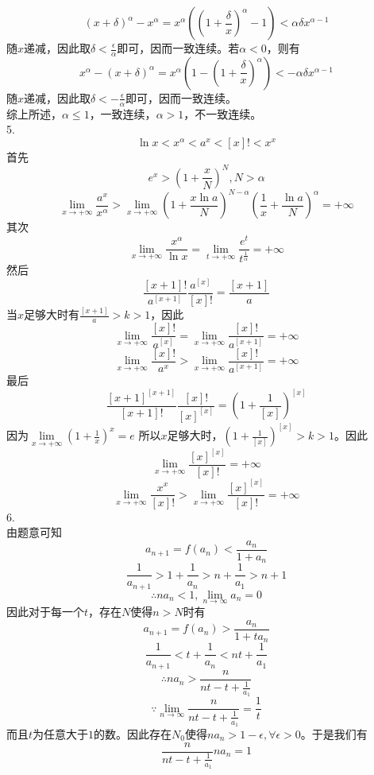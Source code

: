 \documentclass[utf8]{ctexart}
\begin{document}
\[(x+\delta)^\alpha-x^\alpha=x^\alpha((1+\frac{\delta}{x})^\alpha-1)<\alpha\delta x^{\alpha-1}\]
随$x$递减，因此取$\delta<\frac{\epsilon}{\alpha}$即可，因而一致连续。若$\alpha<0$，则有
\[x^\alpha-(x+\delta)^\alpha=x^\alpha(1-(1+\frac{\delta}{x})^\alpha)<-\alpha\delta x^{\alpha-1}\]
随$x$递减，因此取$\delta<-\frac{\epsilon}{\alpha}$即可，因而一致连续。\\
综上所述，$\alpha\le1$，一致连续，$\alpha>1$，不一致连续。\\
5.\\
\[\ln x<x^\alpha<a^x<[x]!<x^x\]
首先
\[e^x>(1+\frac{x}{N})^N,N>\alpha\]
\[\lim\limits_{x\rightarrow+\infty}\frac{a^x}{x^\alpha}>\lim\limits_{x\rightarrow+\infty}(1+\frac{x\ln a}{N})^{N-\alpha}(\frac{1}{x}+\frac{\ln a}{N})^\alpha=+\infty\]
其次
\[\lim\limits_{x\rightarrow+\infty}\frac{x^\alpha}{\ln x}=\lim\limits_{t\rightarrow+\infty}\frac{e^t}{t^\frac{1}{\alpha}}=+\infty\]
然后
\[\frac{[x+1]!}{a^{[x+1]}}\frac{a^{[x]}}{[x]!}=\frac{[x+1]}{a}\]
当$x$足够大时有$\frac{[x+1]}{a}>k>1$，因此
\[\lim\limits_{x\rightarrow+\infty}\frac{[x]!}{a^{[x]}}=\lim\limits_{x\rightarrow+\infty}\frac{[x]!}{a^{[x+1]}}=+\infty\]
\[\lim\limits_{x\rightarrow+\infty}\frac{[x]!}{a^x}>\lim\limits_{x\rightarrow+\infty}\frac{[x]!}{a^{[x+1]}}=+\infty\]
最后
\[\frac{[x+1]^{[x+1]}}{[x+1]!}\frac{[x]!}{[x]^{[x]}}=(1+\frac{1}{[x]})^{[x]}\]
因为$\lim\limits_{x\rightarrow+\infty}(1+\frac{1}{x})^x=e$
所以$x$足够大时，$(1+\frac{1}{[x]})^{[x]}>k>1$。因此
\[\lim\limits_{x\rightarrow+\infty}\frac{[x]^{[x]}}{[x]!}=+\infty\]
\[\lim\limits_{x\rightarrow+\infty}\frac{x^x}{[x]!}>\lim\limits_{x\rightarrow+\infty}\frac{[x]^{[x]}}{[x]!}=+\infty\]
6.\\
由题意可知
\[a_{n+1}=f(a_n)<\frac{a_n}{1+a_n}\]
\[\frac{1}{a_{n+1}}>1+\frac{1}{a_n}>n+\frac{1}{a_1}>n+1\]
\[\therefore na_n<1,\lim\limits_{n\rightarrow\infty}a_n=0\]
因此对于每一个$t$，存在$N$使得$n>N$时有
\[a_{n+1}=f(a_n)>\frac{a_n}{1+ta_n}\]
\[\frac{1}{a_{n+1}}<t+\frac{1}{a_n}<nt+\frac{1}{a_1}\]
\[\therefore na_n>\frac{n}{nt-t+\frac{1}{a_1}}\]
\[\because\lim\limits_{n\rightarrow\infty}\frac{n}{nt-t+\frac{1}{a_1}}=\frac{1}{t}\]
而且$t$为任意大于$1$的数。因此存在$N_0$使得$na_n>1-\epsilon,\forall\epsilon>0$。于是我们有
\[\frac{n}{nt-t+\frac{1}{a_1}}na_n=1\]
\end{document}
